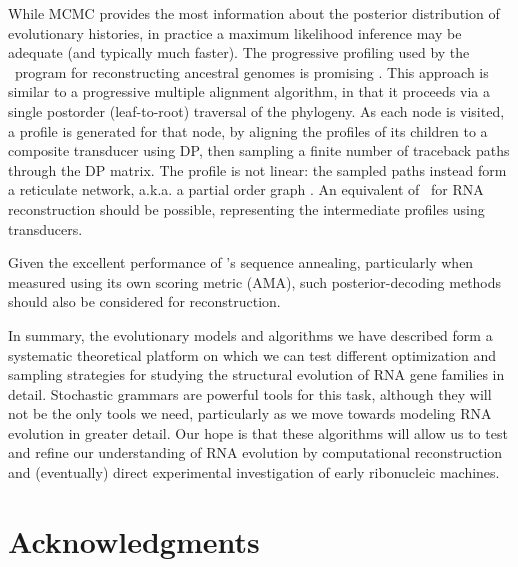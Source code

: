 \documentclass[10pt]{article}
\begin{document}
While MCMC provides the most information about the posterior distribution of evolutionary histories,
in practice a maximum likelihood inference may be adequate (and typically much faster).
The progressive profiling used by the \ortheus\ program for
reconstructing ancestral genomes is promising \cite{PatenHolmesBirney2008}.
This approach is similar to a progressive multiple alignment algorithm, in that it proceeds via a single postorder (leaf-to-root) traversal of the phylogeny.
As each node is visited, a profile is generated for that node, by aligning the profiles of its children to a composite transducer using DP, then sampling a finite number of traceback paths through the DP matrix.
The profile is not linear: the sampled paths instead form a reticulate network, a.k.a. a partial order graph \cite{LeeGrassoSharlow2002}.
An equivalent of \ortheus\ for RNA reconstruction should be possible,
representing the intermediate profiles using transducers.

Given the excellent performance of \stemlocama's sequence annealing, particularly when measured using its own scoring metric (AMA),
such posterior-decoding methods should also be considered for reconstruction.

In summary, the evolutionary models and algorithms we have described form a
systematic theoretical platform on which we can test different optimization and sampling strategies
for studying the structural evolution of RNA gene families in detail.
Stochastic grammars are powerful tools for this task, although they will not be the only tools we need,
particularly as we move towards modeling RNA evolution in greater detail.
Our hope is that these algorithms will allow us to test and refine our
understanding of RNA evolution by computational reconstruction and (eventually)
direct experimental investigation of early ribonucleic machines.











\newpage
\section*{Acknowledgments}
\end{document}
